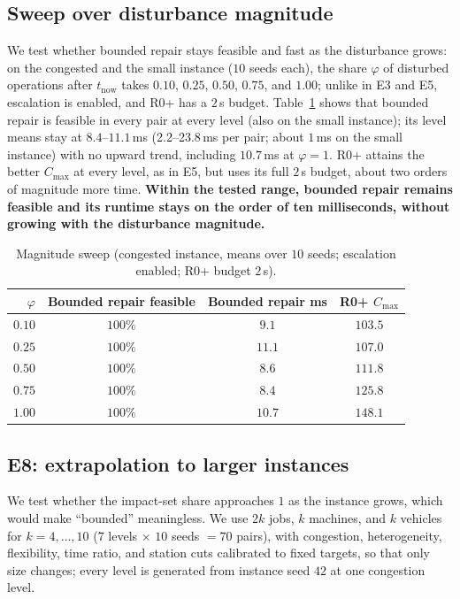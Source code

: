 \documentclass[manuscript,screen,review]{acmart}
\newcommand{\NSeeds}{10}
\newcommand{\ScaleMsMin}{2.2}       %
\newcommand{\ScaleMsMax}{23.8}      %
\newcommand{\ScaleKs}{7}
\newcommand{\ScalePairs}{70}
\begin{document}
\subsection{Sweep over disturbance magnitude}
\label{sec:scale}

We test whether bounded repair stays feasible and fast as the disturbance grows: on the congested and the small instance (\(\NSeeds\) seeds each), the share \(\varphi\) of disturbed operations after \(t_{\mathrm{now}}\) takes \(0.10\), \(0.25\), \(0.50\), \(0.75\), and \(1.00\);
unlike in E3 and E5, escalation is enabled, and R0+ has a \(2\)\,s budget.
Table~\ref{tab:scale} shows that bounded repair is feasible in every pair at every level (also on the small instance); its level means stay at \(8.4\)--\(11.1\)\,ms (\ScaleMsMin--\ScaleMsMax\,ms per pair; about \(1\)\,ms on the small instance) with no upward trend, including \(10.7\)\,ms at \(\varphi=1\).
R0+ attains the better \(C_{\max}\) at every level, as in E5, but uses its full \(2\)\,s budget, about two orders of magnitude more time.
\textbf{Within the tested range, bounded repair remains feasible and its runtime stays on the order of ten milliseconds, without growing with the disturbance magnitude.}

\begin{table}[t]
\centering
\caption{Magnitude sweep (congested instance, means over \(\NSeeds\) seeds; escalation enabled; R0+ budget \(2\)\,s).}
\label{tab:scale}
\small
\begin{tabular}{@{}rccc@{}}
\toprule
\(\varphi\) & Bounded repair feasible & Bounded repair ms & R0+ \(C_{\max}\) \\
\midrule
\(0.10\) & \(100\%\) & \(9.1\)  & \(103.5\) \\
\(0.25\) & \(100\%\) & \(11.1\) & \(107.0\) \\
\(0.50\) & \(100\%\) & \(8.6\)  & \(111.8\) \\
\(0.75\) & \(100\%\) & \(8.4\)  & \(125.8\) \\
\(1.00\) & \(100\%\) & \(10.7\) & \(148.1\) \\
\bottomrule
\end{tabular}
\end{table}

\subsection{E8: extrapolation to larger instances}
\label{sec:instscale}

We test whether the impact-set share approaches \(1\) as the instance grows, which would make ``bounded'' meaningless.
We use \(2k\) jobs, \(k\) machines, and \(k\) vehicles for \(k=4,\dots,10\) (\(\ScaleKs\) levels \(\times\) \(\NSeeds\) seeds \(=\ScalePairs\) pairs), with congestion, heterogeneity, flexibility, time ratio, and station cuts calibrated to fixed targets, so that only size changes; every level is generated from instance seed \(42\) at one congestion level.
\end{document}
